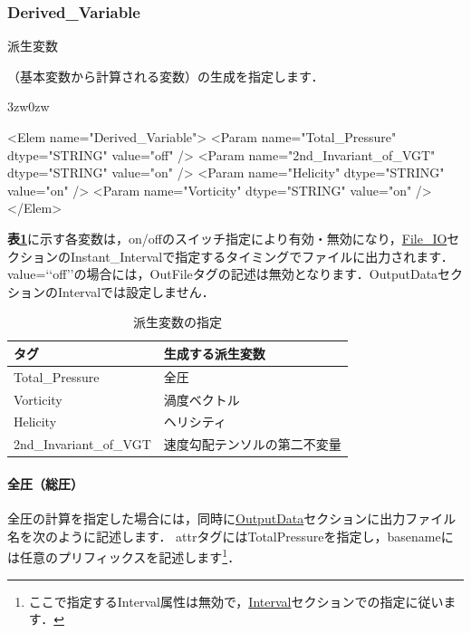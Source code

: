 \pagebreak
\subsubsection{Derived\_Variable}

\hypertarget{tgt:derived_variable}{派生変数}（基本変数から計算される変数）の生成を指定します．

\begin{indentation}{3zw}{0zw}

{\small
\begin{program}
<Elem name="Derived_Variable">
  <Param name="Total_Pressure"       dtype="STRING" value="off" />
  <Param name="2nd_Invariant_of_VGT" dtype="STRING" value="on" />
  <Param name="Helicity"             dtype="STRING" value="on" />
  <Param name="Vorticity"            dtype="STRING" value="on" />
</Elem>
\end{program}
}

\textbf{表\ref{tbl:derived vars}}に示す各変数は，on/offのスイッチ指定により有効・無効になり，\hyperlink{tgt:fileio}{File\_IO}セクションのInstant\_Intervalで指定するタイミングでファイルに出力されます．value=\lq\lq off\rq\rq の場合には，OutFileタグの記述は無効となります．OutputDataセクションのIntervalでは設定しません．

\begin{table}[htdp]
\caption{派生変数の指定}
\begin{center}
\small
\begin{tabular}{ll}\toprule
タグ & 生成する派生変数\\ \midrule
Total\_Pressure & 全圧\\
Vorticity & 渦度ベクトル\\
Helicity & ヘリシティ\\
2nd\_Invariant\_of\_VGT & 速度勾配テンソルの第二不変量\\ \bottomrule
\end{tabular}
\end{center}
\label{tbl:derived vars}
\end{table}

%
\paragraph{全圧（総圧）}
全圧の計算を指定した場合には，同時に\hyperlink{tgt:output_data}{OutputData}セクションに出力ファイル名を次のように記述します．
attrタグにはTotalPressureを指定し，basenameには任意のプリフィックスを記述します\footnote{ここで指定するInterval属性は無効で，\hyperlink{tgt:interval}{Interval}セクションでの指定に従います．}．


\end{indentation}
